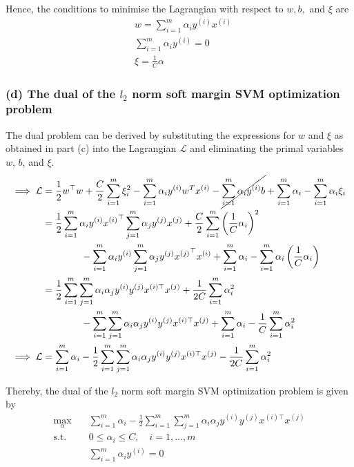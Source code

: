 Hence, the conditions to minimise the Lagrangian with respect to \( w, b, \) and \( \xi \) are
\begin{align*}
     &
    w
    =
    \sum_{i=1}^{m} \alpha_{i} y^{(i)} x^{(i)}
    \\ &
    \sum_{i=1}^{m} \alpha_{i} y^{(i)}
    =
    0
    \\ &
    \xi
    =
    \frac{1}{C} \alpha
\end{align*}

\subsubsection*{(d) The dual of the \( l_{2} \) norm soft margin SVM optimization problem}

The dual problem can be derived by substituting the expressions for \( w \) and \( \xi \) as obtained in part (c) into the Lagrangian \( \mathcal{L} \) and eliminating the primal variables \( w \), \( b \), and \( \xi \).
\begin{align*}
    \implies
    \mathcal{L}
     & =
    \frac{1}{2} w^\top w
    + \frac{C}{2} \sum_{i=1}^{m} \xi_{i}^{2}
    - \sum_{i=1}^{m} \alpha_{i} y^{(i)} w^{T} x^{(i)}
    - \cancel{ \sum_{i=1}^{m} \alpha_{i} y^{(i)} b }
    + \sum_{i=1}^{m} \alpha_{i}
    - \sum_{i=1}^{m} \alpha_{i} \xi_{i}
    \\ & =
    \frac{1}{2}
    \sum_{i=1}^{m} \alpha_{i} y^{(i)} {x^{(i)}}^\top
    \sum_{j=1}^{m} \alpha_{j} y^{(j)} x^{(j)}
    + \frac{C}{2}
    \sum_{i=1}^{m} {\left( \frac{1}{C} \alpha_{i} \right)}^2
    \\ & \qquad \qquad
    - \sum_{i=1}^{m} \alpha_{i} y^{(i)}
    \sum_{j=1}^{m} \alpha_{j} y^{(j)} {x^{(j)}}^\top x^{(i)}
    + \sum_{i=1}^{m} \alpha_{i}
    - \sum_{i=1}^{m} \alpha_{i} \left( \frac{1}{C} \alpha_{i} \right)
    \\ & =
    \frac{1}{2}
    \sum_{i=1}^{m} \sum_{j=1}^{m} \alpha_{i} \alpha_{j} y^{(i)} y^{(j)} x^{(i) \top} x^{(j)}
    + \frac{1}{2C}
    \sum_{i=1}^{m} \alpha_{i}^{2}
    \\ & \qquad \qquad
    - \sum_{i=1}^{m} \sum_{j=1}^{m} \alpha_{i} \alpha_{j} y^{(i)} y^{(j)} x^{(i) \top} x^{(j)}
    + \sum_{i=1}^{m} \alpha_{i}
    - \frac{1}{C}
    \sum_{i=1}^{m} \alpha_{i}^{2}
    \\
    \implies
    \mathcal{L}
     & =
    \sum_{i=1}^{m} \alpha_{i}
    - \frac{1}{2} \sum_{i=1}^{m} \sum_{j=1}^{m} \alpha_{i} \alpha_{j} y^{(i)} y^{(j)} x^{(i) \top} x^{(j)}
    - \frac{1}{2C}
    \sum_{i=1}^{m} \alpha_{i}^{2}
\end{align*}

Thereby, the dual of the \( l_{2} \) norm soft margin SVM optimization problem is given by
\begin{align*}
    \max_{\alpha}
    \quad &
    \sum_{i=1}^{m} \alpha_{i}
    - \frac{1}{2} \sum_{i=1}^{m} \sum_{j=1}^{m} \alpha_{i} \alpha_{j} y^{(i)} y^{(j)} x^{(i) \top} x^{(j)}
    \\
    \text{s.t.}
    \quad &
    0 \leq \alpha_{i} \leq C
    , \quad i = 1, \ldots, m
    \\ &
    \sum_{i=1}^{m} \alpha_{i} y^{(i)} = 0
\end{align*}
